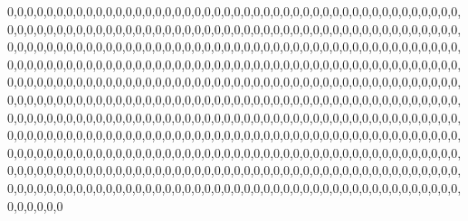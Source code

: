 0,0,0,0,0,0,0,0,0,0,0,0,0,0,0,0,0,0,0,0,0,0,0,0,0,0,0,0,0,0,0,0,0,0,0,0,0,0,0,0,0,0,0,0,0,0,0,0,0,0,0,0,0,0,0,0,0,0,0,0,0,0,0,0,0,0,0,0,0,0,0,0,0,0,0,0,0,0,0,0,0,0,0,0,0,0,0,0,0,0,0,0,0,0,0,0,0,0,0,0,0,0,0,0,0,0,0,0,0,0,0,0,0,0,0,0,0,0,0,0,0,0,0,0,0,0,0,0,0,0,0,0,0,0,0,0,0,0,0,0,0,0,0,0,0,0,0,0,0,0,0,0,0,0,0,0,0,0,0,0,0,0,0,0,0,0,0,0,0,0,0,0,0,0,0,0,0,0,0,0,0,0,0,0,0,0,0,0,0,0,0,0,0,0,0,0,0,0,0,0,0,0,0,0,0,0,0,0,0,0,0,0,0,0,0,0,0,0,0,0,0,0,0,0,0,0,0,0,0,0,0,0,0,0,0,0,0,0,0,0,0,0,0,0,0,0,0,0,0,0,0,0,0,0,0,0,0,0,0,0,0,0,0,0,0,0,0,0,0,0,0,0,0,0,0,0,0,0,0,0,0,0,0,0,0,0,0,0,0,0,0,0,0,0,0,0,0,0,0,0,0,0,0,0,0,0,0,0,0,0,0,0,0,0,0,0,0,0,0,0,0,0,0,0,0,0,0,0,0,0,0,0,0,0,0,0,0,0,0,0,0,0,0,0,0,0,0,0,0,0,0,0,0,0,0,0,0,0,0,0,0,0,0,0,0,0,0,0,0,0,0,0,0,0,0,0,0,0,0,0,0,0,0,0,0,0,0,0,0,0,0,0,0,0,0,0,0,0,0,0,0,0,0,0,0,0,0,0,0,0,0,0,0,0,0,0,0,0,0,0,0,0,0,0,0,0,0,0,0,0,0,0,0,0,0,0,0,0,0,0,0,0,0,0,0,0,0,0,0,0,0,0,0,0,0,0,0,0,0,0,0,0,0,0,0,0,0,0,0,0,0,0,0,0,0,0,0,0,0,0,0,0,0,0,0,0,0,0,0,0,0,0,0,0,0,0,0,0,0,0,0,0,0,0,0,0,0,0,0,0,0,0
